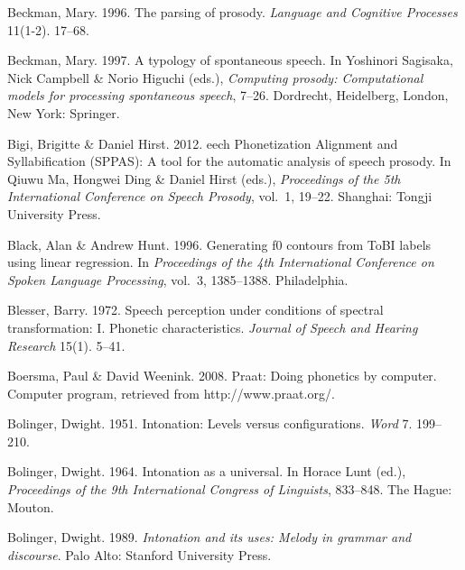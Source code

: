 \documentclass[ number=1
,series=labphon
,output=long
,url=http://langsci-press.org/catalog/book/16
,isbn=978-3-944675-01-5
]{LSP/langsci}
\begin{document}
\begin{thebibliography}{284}
Beckman, Mary. 1996.
\newblock The parsing of prosody.
\newblock \emph{Language and Cognitive Processes} 11(1-2). 17--68.

Beckman, Mary. 1997.
\newblock A typology of spontaneous speech.
\newblock In Yoshinori Sagisaka, Nick Campbell \& Norio Higuchi (eds.),
  \emph{Computing prosody: {C}omputational models for processing spontaneous
  speech}, 7--26. Dordrecht, Heidelberg, London, New York: Springer.

Bigi, Brigitte \& Daniel Hirst. 2012.
eech {P}honetization {A}lignment and {S}yllabification ({SPPAS}):
  {A} tool for the automatic analysis of speech prosody.
\newblock In Qiuwu Ma, Hongwei Ding \& Daniel Hirst (eds.), \emph{Proceedings
  of the 5th {I}nternational {C}onference on {S}peech {P}rosody}, vol.~1,
  19--22. Shanghai: Tongji University Press.

Black, Alan \& Andrew Hunt. 1996.
\newblock Generating f0 contours from {ToBI} labels using linear regression.
\newblock In \emph{Proceedings of the 4th {International Conference on Spoken
  Language Processing}}, vol.~3, 1385--1388. Philadelphia.

Blesser, Barry. 1972.
\newblock Speech perception under conditions of spectral transformation: {I}.
  {P}honetic characteristics.
\newblock \emph{Journal of Speech and Hearing Research} 15(1). 5--41.

Boersma, Paul \& David Weenink. 2008.
\newblock Praat: {D}oing phonetics by computer.
\newblock Computer program, retrieved from http://www.praat.org/.

Bolinger, Dwight. 1951.
\newblock Intonation: {L}evels versus configurations.
\newblock \emph{Word} 7. 199--210.

Bolinger, Dwight. 1964.
\newblock Intonation as a universal.
\newblock In Horace Lunt (ed.), \emph{Proceedings of the 9th {I}nternational
  {C}ongress of {L}inguists}, 833--848. The Hague: Mouton.

Bolinger, Dwight. 1989.
\newblock \emph{Intonation and its uses: {M}elody in grammar and discourse}.
\newblock Palo Alto: Stanford University Press.


\end{thebibliography}
\end{document}
